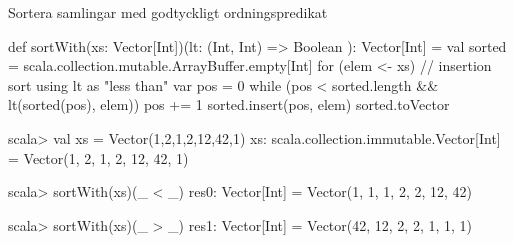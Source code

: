 






\begin{Slide}{Sortera samlingar med godtyckligt ordningspredikat}
\begin{CodeSmall}
def sortWith(xs: Vector[Int])(lt: (Int, Int) => Boolean ): Vector[Int] = {
  val sorted = scala.collection.mutable.ArrayBuffer.empty[Int]
  for (elem <- xs) {  // insertion sort using lt as "less than"
     var pos = 0
     while (pos < sorted.length && lt(sorted(pos), elem)) {
       pos += 1
     }
     sorted.insert(pos, elem)
  }
  sorted.toVector
}
\end{CodeSmall}
\pause
\begin{REPL}
scala> val xs = Vector(1,2,1,2,12,42,1)
xs: scala.collection.immutable.Vector[Int] = Vector(1, 2, 1, 2, 12, 42, 1)

scala> sortWith(xs)(_ < _)
res0: Vector[Int] = Vector(1, 1, 1, 2, 2, 12, 42)

scala> sortWith(xs)(_ > _)
res1: Vector[Int] = Vector(42, 12, 2, 2, 1, 1, 1)
\end{REPL}
\end{Slide}


